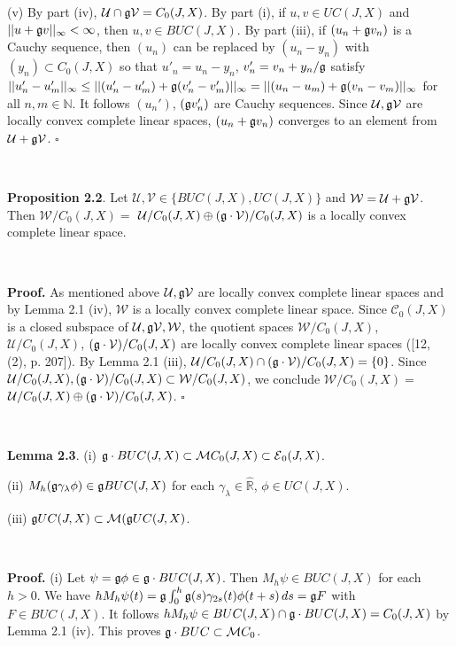 \documentclass[10pt,onside,reqno]{amsart}
\newcommand{\Ndb}{\mbox{$\mathbb{N}$}}
\newcommand{\Rdb}{\mbox{$\mathbb{R}$}}
\newcommand{\C}{\mbox{${\mathcal C}$}}
\newcommand{\E}{\mbox{${\mathcal E}$}}
\newcommand{\M}{\mbox{${\mathcal M}$}}
\newcommand{\U}{\mbox{${\mathcal U}$}}
\newcommand{\V}{\mbox{${\mathcal V}$}}
\newcommand{\W}{\mbox{${\mathcal W}$}}
\theoremstyle{remark}
\theoremstyle{definition}
\begin{document}
(v)  By part (iv), $\U \cap \frak{g} \V= C_0 (J,X)$.  By part (i), if  $u, v \in UC(J,X)$ and $||u+\frak{g} v||_{\infty} < \infty$, then  $u,v \in BUC(J,X)$. By part (iii), if $(u_n+\frak{g} v_n)$ is a Cauchy sequence, then $(u_n)$ can be replaced by $(u_n-y_n)$ with $(y_n) \subset C_0 (J,X)$ so that $u'_n=u_n-y_n$,  $v'_n=v_n+y_n/\frak{g}$ satisfy $|| u'_n-u'_m||_{\infty} \le || (u'_n-u'_m)+\frak{g} (v'_n-v'_m)||_{\infty}= || (u_n-u_m)+\frak{g} (v_n-v_m)||_{\infty}$ for all  $n, m\in \Ndb$. It follows  $(u_n')$,   $(\frak{g}v'_n)$ are Cauchy sequences. Since $\U,  \frak{g} \V$ are locally convex complete linear spaces,  $(u_n+\frak{g} v_n)$ converges to an element from $\U + \frak{g} \V$.
 $\square$

\




\noindent\textbf{Proposition 2.2}. Let $ \U, \V\in \{BUC(J,X), UC(J,X)\}$ and $ \W=\U+\frak {g} \V$. Then
 $\W/C_{0}(J,X)= $
 $ \U/C_{0}(J,X)\oplus (\frak{g}\cdot \V)/C_{0}(J,X)$ is a  locally convex complete linear space.


\

\noindent\textbf{Proof.} As mentioned above  $\U,\frak{g} \V$ are  locally convex complete linear spaces and by  Lemma 2.1 (iv), $\W$  is a locally convex complete linear space. Since  $\C_0(J,X)$ is a closed subspace of $\U,\frak{g} \V, \W$, the quotient spaces   $\W/C_{0}(J,X) $,
 $ \U/C_{0}(J,X)$, $ (\frak{g}\cdot \V)/C_{0}(J,X)$  are  locally convex complete linear spaces ([12, (2), p. 207]). By Lemma 2.1 (iii),  $ \U/C_{0}(J,X)\cap (\frak{g}\cdot \V)/C_{0}(J,X)= \{0\}$. Since  $ \U/C_{0}(J,X), (\frak{g}\cdot \V)/C_{0}(J,X)\subset \W/C_{0}(J,X) $, we conclude  $\W/C_{0}(J,X)= $
 $ \U/C_{0}(J,X)\oplus (\frak{g}\cdot \V)/C_{0}(J,X)$. $\square$

\

\noindent\textbf{Lemma 2.3}. (i) $\frak{g}\cdot BUC(J,X)\subset \M  C_{0}(J,X)\subset\E_0 (J,X)$.

(ii) $M_h (\frak{g}\gamma_{\lambda}\phi) \in \frak{g} BUC(J,X)$ for each $\gamma_{\lambda}\in \widehat {\Rdb}$, $\phi \in UC(J,X)$.

(iii) $ \frak{g}UC (J,X) \subset   \M(\frak{g}UC (J,X)$.



\


\noindent\textbf{Proof.} (i) Let $\psi= \frak{g}\phi\in \frak{g}\cdot
BUC(J,X)$. Then $M_h \psi\in BUC(J,X)$ for each $h>0$. We
have  $hM_h \psi (t)=\frak{g}\int_0^h
\frak{g}(s)\gamma_{2s}(t)\phi(t+s)\,ds=\frak{g}F$ with $F\in
BUC(J,X)$. It follows $hM_h \psi\in BUC(J,X)\cap
\frak{g}\cdot BUC(J,X) =C_0 (J,X)$ by Lemma
 2.1  (iv). This proves  $\frak{g}\cdot BUC\subset \M  C_{0}$.
\end{document}
